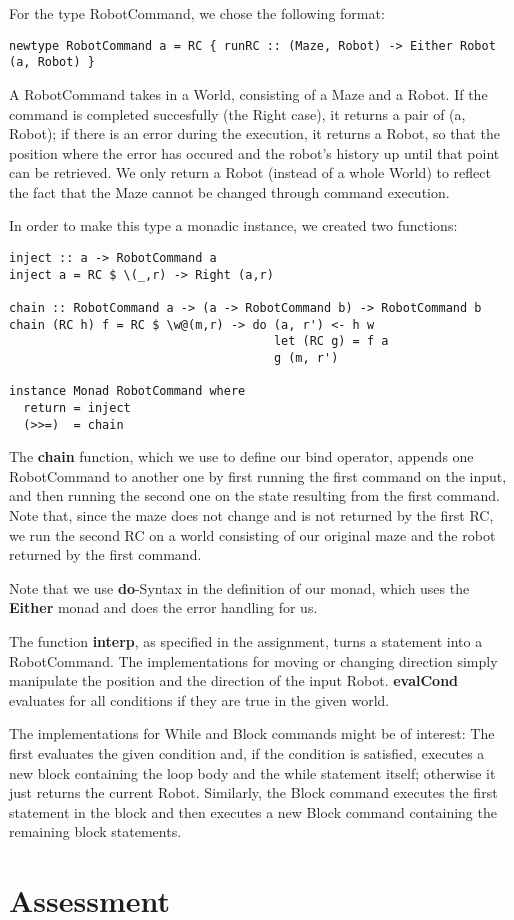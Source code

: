 \documentclass[a4paper,11pt]{article}
\begin{document}
For the type RobotCommand, we chose the following format:
\begin{verbatim}
newtype RobotCommand a = RC { runRC :: (Maze, Robot) -> Either Robot (a, Robot) }
\end{verbatim}
A RobotCommand takes in a World, consisting of a Maze and a Robot. If the command is completed succesfully (the Right case), it returns a pair of (a, Robot); if there is an error during the execution, it returns a Robot, so that the position where the error has occured and the robot's history up until that point can be retrieved. We only return a Robot (instead of a whole World) to reflect the fact that the Maze cannot be changed through command execution.

In order to make this type a monadic instance, we created two functions:

\begin{verbatim}
inject :: a -> RobotCommand a
inject a = RC $ \(_,r) -> Right (a,r)
 
chain :: RobotCommand a -> (a -> RobotCommand b) -> RobotCommand b
chain (RC h) f = RC $ \w@(m,r) -> do (a, r') <- h w
                                     let (RC g) = f a
                                     g (m, r')
                                     
instance Monad RobotCommand where
  return = inject
  (>>=)  = chain
\end{verbatim}
The \textbf{chain} function, which we use to define our bind operator, appends one RobotCommand to another one by first running the first command on the input, and then running the second one on the state resulting from the first command. Note that, since the maze does not change and is not returned by the first RC, we run the second RC on a world consisting of our original maze and the robot returned by the first command.

Note that we use \textbf{do}-Syntax in the definition of our monad, which uses the \textbf{Either} monad and does the error handling for us.

The function \textbf{interp}, as specified in the assignment, turns a statement into a RobotCommand. The implementations for moving or changing direction simply manipulate the position and the direction of the input Robot. \textbf{evalCond} evaluates for all conditions if they are true in the given world. 

The implementations for While and Block commands might be of interest: The first evaluates the given condition and, if the condition is satisfied, executes a new block containing the loop body and the while statement itself; otherwise it just returns the current Robot. Similarly, the Block command executes the first statement in the block and then executes a new Block command containing the remaining block statements.




\section{Assessment}
\end{document}
